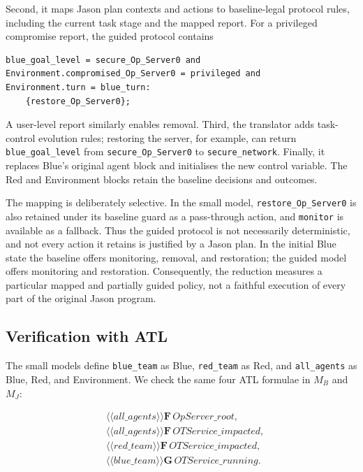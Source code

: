 \documentclass[runningheads]{llncs}
\begin{document}
Second, it maps Jason plan contexts and actions to baseline-legal protocol rules, including the current task stage and the mapped report. For a privileged compromise report, the guided protocol contains

\begin{verbatim}
blue_goal_level = secure_Op_Server0 and
Environment.compromised_Op_Server0 = privileged and
Environment.turn = blue_turn:
    {restore_Op_Server0};
\end{verbatim}

A user-level report similarly enables removal. Third, the translator adds task-control evolution rules; restoring the server, for example, can return \texttt{blue\_goal\_level} from \texttt{secure\_Op\_Server0} to \texttt{secure\_network}. Finally, it replaces Blue's original agent block and initialises the new control variable. The Red and Environment blocks retain the baseline decisions and outcomes.

The mapping is deliberately selective. In the small model, \texttt{restore\_Op\_Server0} is also retained under its baseline guard as a pass-through action, and \texttt{monitor} is available as a fallback. Thus the guided protocol is not necessarily deterministic, and not every action it retains is justified by a Jason plan. In the initial Blue state the baseline offers monitoring, removal, and restoration; the guided model offers monitoring and restoration. Consequently, the reduction measures a particular mapped and partially guided policy, not a faithful execution of every part of the original Jason program.

\subsection{Verification with ATL}

The small models define \texttt{blue\_team} as Blue, \texttt{red\_team} as Red, and \texttt{all\_agents} as Blue, Red, and Environment. We check the same four ATL formulae in $M_B$ and $M_J$:

\begin{align*}
&\langle\!\langle\mathit{all\_agents}\rangle\!\rangle
\mathbf{F}\,\mathit{OpServer\_root},\\
&\langle\!\langle\mathit{all\_agents}\rangle\!\rangle
\mathbf{F}\,\mathit{OTService\_impacted},\\
&\langle\!\langle\mathit{red\_team}\rangle\!\rangle
\mathbf{F}\,\mathit{OTService\_impacted},\\
&\langle\!\langle\mathit{blue\_team}\rangle\!\rangle
\mathbf{G}\,\mathit{OTService\_running}.
\end{align*}
\end{document}
